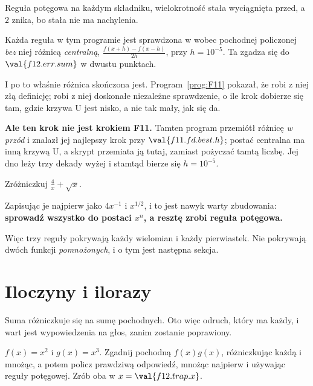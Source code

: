 \begin{fr}
Reguła potęgowa na każdym składniku, wielokrotność stała wyciągnięta przed, a
$2$ znika, bo stała nie ma nachylenia.

\begin{note}
Każda reguła w tym programie jest sprawdzona w
 wobec pochodnej policzonej \emph{bez} niej
\dash{} różnicą \emph{centralną}, $\frac{f(x+h) - f(x-h)}{2h}$, przy
$h = 10^{-5}$. Ta zgadza się do $\val{f12.err.sum}$ w dwustu punktach.

I po to właśnie różnica skończona jest. Program~\ref{prog:F11} pokazał, że
robi z niej złą definicję; robi z niej doskonałe niezależne sprawdzenie, o ile
krok dobierze się tam, gdzie krzywa U jest nisko, a nie tak mały, jak się da.

\textbf{Ale ten krok nie jest krokiem F11.} Tamten program przemiótł różnicę
\emph{w przód} i znalazł jej najlepszy krok przy $\val{f11.fd.best.h}$;
postać centralna ma inną krzywą U, a skrypt przemiata ją tutaj, zamiast
pożyczać tamtą liczbę. Jej dno leży trzy dekady wyżej i stamtąd bierze się
$h = 10^{-5}$.
\end{note}

Zróżniczkuj $\frac{4}{x} + \sqrt{x}$.
\nextframe
\end{fr}

\begin{fr}
Zapisując je najpierw jako $4x^{-1}$ i $x^{1/2}$, i to jest nawyk warty
zbudowania: \textbf{sprowadź wszystko do postaci $x^{n}$, a resztę zrobi
reguła potęgowa.}

Więc trzy reguły pokrywają każdy wielomian i każdy pierwiastek. Nie pokrywają
dwóch funkcji \emph{pomnożonych}, i o tym jest następna sekcja.
\end{fr}

\section{Iloczyny i ilorazy}
\label{sec:F12-product}

\begin{fr}
Suma różniczkuje się na sumę pochodnych. Oto więc odruch, który ma każdy, i
wart jest wypowiedzenia na głos, zanim zostanie poprawiony.

$f(x) = x^{2}$ i $g(x) = x^{3}$. Zgadnij pochodną $f(x)g(x)$, różniczkując
każdą i mnożąc, a potem policz prawdziwą odpowiedź, mnożąc najpierw i używając
reguły potęgowej. Zrób oba w $x = \val{f12.trap.x}$.
\dotline
\nextframe
\end{fr}

